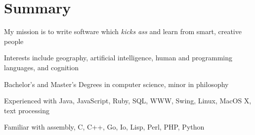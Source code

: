 \raggedright
\section*{Summary}
  \begin{compactitem}
    \item My mission is to write software which \emph{kicks ass} and learn from smart, creative people
    \item Interests include geography, artificial intelligence, human and programming languages, and cognition
    \item Bachelor's and Master's Degrees in computer science, minor in philosophy
    \item Experienced with Java, JavaScript, Ruby, SQL, WWW, Swing, Linux, MacOS X, text processing
    \item Familiar with assembly, C, C++, Go, Io, Lisp, Perl, PHP, Python
  \end{compactitem}
